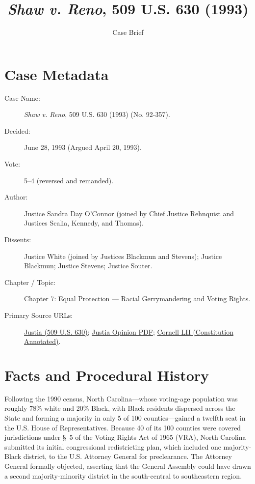 \documentclass[12pt]{article}
\title{\textit{Shaw v. Reno}, 509 U.S. 630 (1993)}
\author{Case Brief}
\date{}
\begin{document}
\maketitle

\section{Case Metadata}
\begin{description}
  \item[Case Name:] \textit{Shaw v. Reno}, 509 U.S. 630 (1993) (No. 92-357).
  \item[Decided:] June 28, 1993 (Argued April 20, 1993).
  \item[Vote:] 5--4 (reversed and remanded).
  \item[Author:] Justice Sandra Day O'Connor (joined by Chief Justice Rehnquist and Justices Scalia, Kennedy, and Thomas).
  \item[Dissents:] Justice White (joined by Justices Blackmun and Stevens); Justice Blackmun; Justice Stevens; Justice Souter.
  \item[Chapter / Topic:] Chapter 7: Equal Protection --- Racial Gerrymandering and Voting Rights.
  \item[Primary Source URLs:] \href{https://supreme.justia.com/cases/federal/us/509/630/}{Justia (509 U.S. 630)}; \href{https://supreme.justia.com/cases/federal/us/509/630/case.pdf}{Justia Opinion PDF}; \href{https://www.law.cornell.edu/constitution-conan/amendment-15/racial-gerrymandering-and-right-to-vote-clause}{Cornell LII (Constitution Annotated)}.
\end{description}

\section{Facts and Procedural History}
Following the 1990 census, North Carolina---whose voting-age population was roughly 78\% white and 20\% Black, with Black residents dispersed across the State and forming a majority in only 5 of 100 counties---gained a twelfth seat in the U.S. House of Representatives. Because 40 of its 100 counties were covered jurisdictions under \S~5 of the Voting Rights Act of 1965 (VRA), North Carolina submitted its initial congressional redistricting plan, which included one majority-Black district, to the U.S. Attorney General for preclearance. The Attorney General formally objected, asserting that the General Assembly could have drawn a second majority-minority district in the south-central to southeastern region.
\end{document}
